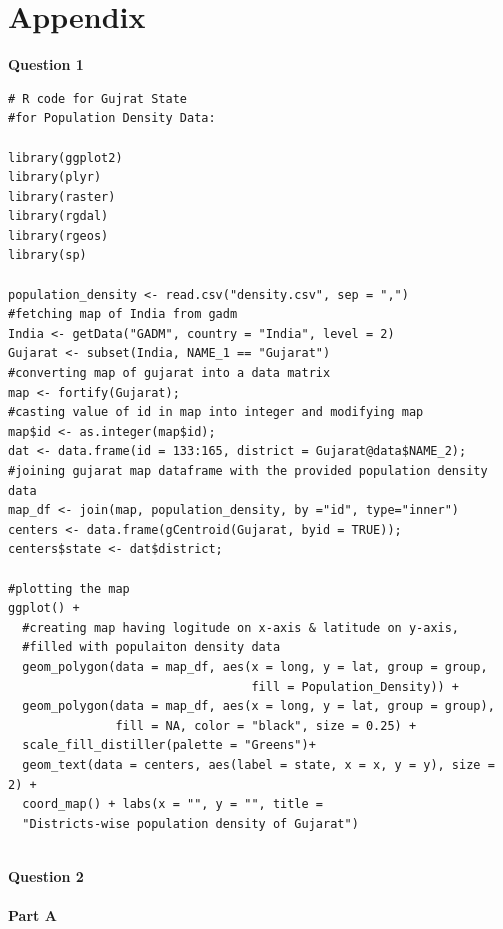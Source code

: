 \documentclass[12pt,a4paper]{report}
\begin{document}
\section{Appendix}
\textbf{Question 1}\\
\begin{lstlisting}
# R code for Gujrat State
#for Population Density Data:

library(ggplot2)
library(plyr)
library(raster)
library(rgdal)
library(rgeos)
library(sp)

population_density <- read.csv("density.csv", sep = ",")
#fetching map of India from gadm
India <- getData("GADM", country = "India", level = 2)  
Gujarat <- subset(India, NAME_1 == "Gujarat")
#converting map of gujarat into a data matrix
map <- fortify(Gujarat);  
#casting value of id in map into integer and modifying map
map$id <- as.integer(map$id);  
dat <- data.frame(id = 133:165, district = Gujarat@data$NAME_2);	  
#joining gujarat map dataframe with the provided population density data
map_df <- join(map, population_density, by ="id", type="inner")
centers <- data.frame(gCentroid(Gujarat, byid = TRUE));  
centers$state <- dat$district;  	

#plotting the map
ggplot() +
  #creating map having logitude on x-axis & latitude on y-axis, 
  #filled with populaiton density data
  geom_polygon(data = map_df, aes(x = long, y = lat, group = group,
                                  fill = Population_Density)) +
  geom_polygon(data = map_df, aes(x = long, y = lat, group = group),
               fill = NA, color = "black", size = 0.25) +
  scale_fill_distiller(palette = "Greens")+
  geom_text(data = centers, aes(label = state, x = x, y = y), size = 2) + 
  coord_map() + labs(x = "", y = "", title = 
  "Districts-wise population density of Gujarat") 


\end{lstlisting}
\textbf{Question 2}
\\
\\
\textbf{Part A}
\end{document}
